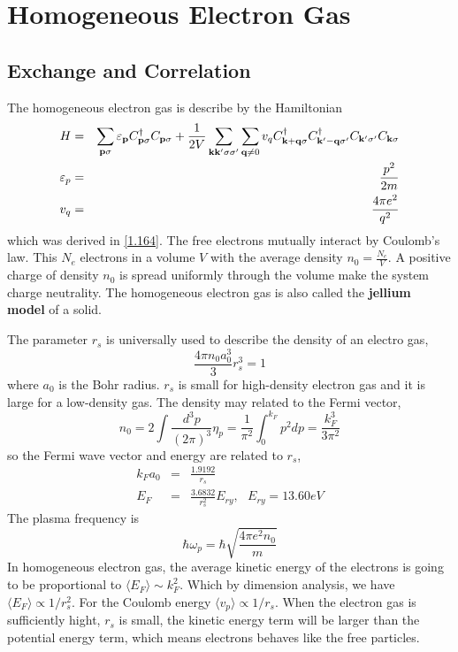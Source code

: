 \chapter{Homogeneous Electron Gas}

\section{Exchange and Correlation}\label{s5.1}
The homogeneous electron gas is describe by the Hamiltonian
\begin{eqnarray}
    H &=& \sum_{\mathbf{p}\sigma} \varepsilon_{\mathbf{p}} C^\dagger_{\mathbf{p}\sigma} C_{\mathbf{p}\sigma} + \frac{1}{2V} \sum_{\mathbf{k}\mathbf{k}'\sigma\sigma'} \sum_{\mathbf{q}\neq 0} v_q C^\dagger_{\mathbf{k}+\mathbf{q} \sigma} C^\dagger_{\mathbf{k}'-\mathbf{q} \sigma'} C_{\mathbf{k}'\sigma'} C_{\mathbf{k}\sigma} \label{5.1} \\
\varepsilon_p &=& \frac{p^2}{2m} \nonumber \\
v_q &=& \frac{4\pi e^2}{q^2} \label{5.2}
\end{eqnarray}
which was derived in \eqref{1.164}.
The free electrons mutually interact by Coulomb's law.
This $N_e$ electrons in a volume $V$ with the average density $n_0 = \frac{N_e}{V}$.
A positive charge of density $n_0$ is spread uniformly through the volume make the system charge neutrality.
The homogeneous electron gas is also called the \textbf{jellium model} of a solid.

The parameter $r_s$ is universally used to describe the density of an electro gas,
\begin{equation}
    \frac{4\pi n_0 a_0^3}{3} r_s^3 =1 \label{5.3}
\end{equation}
where $a_0$ is the Bohr radius.
$r_s$ is small for high-density electron gas and it is large for a low-density gas.
The density may related to the Fermi vector,
\begin{equation}
    n_0 = 2 \int \frac{d^3 p}{(2\pi)^3} \eta_p = \frac{1}{\pi^2} \int_0^{k_F} p^2 dp = \frac{k_F^3}{3\pi^2}     \label{5.4}
\end{equation}
so the Fermi wave vector and energy are related to $r_s$,
\begin{eqnarray}
    k_F a_0 &=& \frac{1.9192}{r_s} \nonumber \\
    E_F &=& \frac{3.6832}{r_s^2}  E_{ry}, ~ ~ ~ E_{ry}=13.60 eV \label{5.5}
\end{eqnarray}
The plasma frequency is
\begin{equation}
    \hbar \omega_p = \hbar \sqrt{ \frac{4\pi e^2 n_0}{m}  }     \label{5.6}
\end{equation}
In homogeneous electron gas, the average kinetic energy of the electrons is going to be proportional to $\langle E_F \rangle \sim k_F^2$.
Which by dimension analysis, we have $\langle E_F \rangle\propto 1/r_s^2$.
For the Coulomb energy $\langle v_p \rangle \propto 1/r_s$.
When the electron gas is sufficiently hight, $r_s$ is small, the kinetic energy term will be larger than the potential energy term, which means electrons behaves like the free particles.


